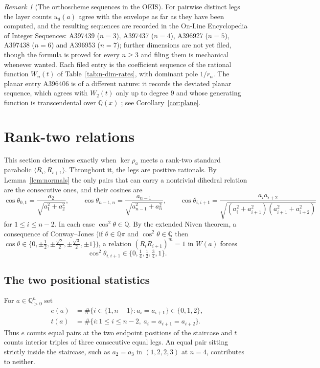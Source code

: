 \documentclass[11pt,a4paper]{article}
\newcommand{\Q}{\mathbb{Q}}
\theoremstyle{definition}
\theoremstyle{remark}
\newtheorem{remark}[theorem]{Remark}
\theoremstyle{plain}
\begin{document}
\begin{remark}[The orthoscheme sequences in the OEIS]\label{rem:oeis}
For pairwise distinct legs the layer counts $u_d(a)$ agree with the envelope as far as they have
been computed, and the resulting sequences are recorded in the On-Line Encyclopedia of Integer
Sequences: A397439 ($n=3$), A397437 ($n=4$), A396927 ($n=5$), A397438 ($n=6$) and A396953
($n=7$); further dimensions are not yet filed, though the formula is proved for every $n\ge3$
and filing them is mechanical whenever wanted. Each filed entry is the coefficient sequence of
the rational function
$W_n(t)$ of Table~\ref{tab:n-dim-rates}, with dominant pole $1/r_n$. The planar entry A396406 is
of a different nature: it records the deviated planar sequence, which agrees with $W_2(t)$ only
up to degree $9$ and whose generating function is transcendental over $\Q(x)$
\cite{Bonfioli1}; see Corollary~\ref{cor:plane}.
\end{remark}

\section{Rank-two relations}\label{sec:rank2}

This section determines exactly when $\ker\rho_a$ meets a rank-two standard parabolic
$\langle R_i,R_{i+1}\rangle$. Throughout it, the legs are positive rationals. By
Lemma~\ref{lem:normals} the only pairs that can carry a nontrivial dihedral relation are the
consecutive ones, and their cosines are
\begin{equation}\label{eq:cosines}
\cos\theta_{0,1}=\frac{a_2}{\sqrt{a_1^2+a_2^2}},\qquad
\cos\theta_{n-1,n}=\frac{a_{n-1}}{\sqrt{a_{n-1}^2+a_n^2}},\qquad
\cos\theta_{i,i+1}=\frac{a_ia_{i+2}}{\sqrt{(a_i^2+a_{i+1}^2)(a_{i+1}^2+a_{i+2}^2)}}
\end{equation}
for $1\le i\le n-2$. In each case $\cos^2\theta\in\Q$. By the extended Niven theorem, a
consequence of Conway--Jones \cite{conway-jones} (if $\theta\in\Q\pi$ and $\cos^2\theta\in\Q$
then $\cos\theta\in\{0,\pm\tfrac12,\pm\tfrac{\sqrt2}2,\pm\tfrac{\sqrt3}2,\pm1\}$), a relation
$(R_iR_{i+1})^m=1$ in $W(a)$ forces
\[
\cos^2\theta_{i,i+1}\in\{0,\tfrac14,\tfrac12,\tfrac34,1\}.
\]

\subsection{The two positional statistics}

For $a\in\Q_{>0}^n$ set
\begin{align*}
e(a)&=\#\bigl\{i\in\{1,n-1\}:a_i=a_{i+1}\bigr\}\in\{0,1,2\},\\
t(a)&=\#\bigl\{i:1\le i\le n-2,\ a_i=a_{i+1}=a_{i+2}\bigr\}.
\end{align*}
Thus $e$ counts equal pairs at the two endpoint positions of the staircase and $t$ counts
interior triples of three consecutive equal legs. An equal pair sitting strictly inside the
staircase, such as $a_2=a_3$ in $(1,2,2,3)$ at $n=4$, contributes to neither.
\end{document}
